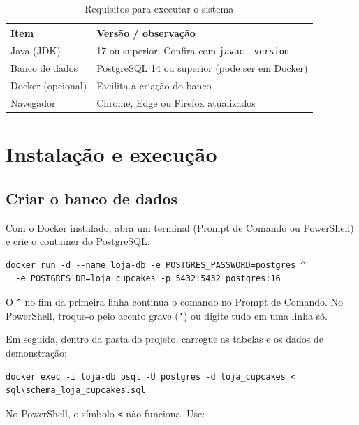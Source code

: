 \documentclass[12pt]{article}
\begin{document}
\begin{table}[H]
\centering
\renewcommand{\arraystretch}{1.25}
\begin{tabular}{|l|p{8.5cm}|}
\hline
\rowcolor{gray!30} \textbf{Item} & \textbf{Versão / observação} \\ \hline
Java (JDK) & 17 ou superior. Confira com \texttt{javac -version} \\ \hline
Banco de dados & PostgreSQL 14 ou superior (pode ser em Docker) \\ \hline
Docker (opcional) & Facilita a criação do banco \\ \hline
Navegador & Chrome, Edge ou Firefox atualizados \\ \hline
\end{tabular}
\caption{Requisitos para executar o sistema}
\end{table}

\section{Instalação e execução}

\subsection{Criar o banco de dados}

Com o Docker instalado, abra um terminal (Prompt de Comando ou PowerShell) e crie o container do PostgreSQL:

\begin{Verbatim}[fontsize=\footnotesize, frame=single]
docker run -d --name loja-db -e POSTGRES_PASSWORD=postgres ^
  -e POSTGRES_DB=loja_cupcakes -p 5432:5432 postgres:16
\end{Verbatim}

O \texttt{\^{}} no fim da primeira linha continua o comando no Prompt de Comando. No PowerShell, troque-o pelo acento grave (\texttt{`}) ou digite tudo em uma linha só.

Em seguida, dentro da pasta do projeto, carregue as tabelas e os dados de demonstração:

\begin{Verbatim}[fontsize=\footnotesize, frame=single]
docker exec -i loja-db psql -U postgres -d loja_cupcakes < sql\schema_loja_cupcakes.sql
\end{Verbatim}

No PowerShell, o símbolo \texttt{<} não funciona. Use:
\end{document}

